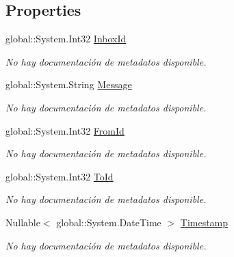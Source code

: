 \subsection*{Properties}
\begin{DoxyCompactItemize}
\item 
global\-::\-System.\-Int32 \hyperlink{class_game_memory_1_1_inboxes_ad8f869d6ea30424629d6ee2e041316fc}{Inbox\-Id}
\begin{DoxyCompactList}\small\item\em No hay documentación de metadatos disponible. \end{DoxyCompactList}\item 
global\-::\-System.\-String \hyperlink{class_game_memory_1_1_inboxes_ab8eb8f6957620e9bf3d3b18cea3f75f2}{Message}
\begin{DoxyCompactList}\small\item\em No hay documentación de metadatos disponible. \end{DoxyCompactList}\item 
global\-::\-System.\-Int32 \hyperlink{class_game_memory_1_1_inboxes_af290b883d1ef6a7f31238bc84ee769ed}{From\-Id}
\begin{DoxyCompactList}\small\item\em No hay documentación de metadatos disponible. \end{DoxyCompactList}\item 
global\-::\-System.\-Int32 \hyperlink{class_game_memory_1_1_inboxes_a198041e29fa5ce1049faf5d86a1adc8d}{To\-Id}
\begin{DoxyCompactList}\small\item\em No hay documentación de metadatos disponible. \end{DoxyCompactList}\item 
Nullable$<$ global\-::\-System.\-Date\-Time $>$ \hyperlink{class_game_memory_1_1_inboxes_afded22c9818903a94a37984e929150d8}{Timestamp}
\begin{DoxyCompactList}\small\item\em No hay documentación de metadatos disponible. \end{DoxyCompactList}\item 

\end{DoxyCompactItemize}
